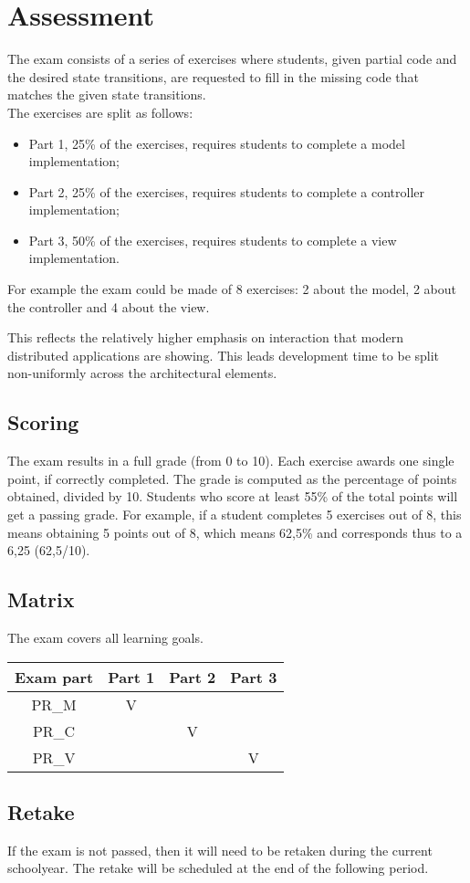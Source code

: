 \section{Assessment}

The exam consists of a series of exercises where students, given partial
code and the desired state transitions, are requested to fill in the
missing code that matches the given state transitions.
\\
The exercises are split as follows: 
\begin{itemize}
\item Part 1, 25\% of the exercises, requires students to complete a model implementation; 
\item Part 2, 25\% of the exercises, requires students to complete a controller implementation; 
\item Part 3, 50\% of the exercises, requires students to complete a view implementation.
\end{itemize}

For example the exam could be made of 8 exercises: 2 about the model, 2
about the controller and 4 about the view.

This reflects the relatively higher emphasis on interaction that modern
distributed applications are showing. This leads development time to be
split non-uniformly across the architectural elements.

\subsection*{Scoring}

The exam results in a full grade (from 0 to 10). Each exercise awards
one single point, if correctly completed. The grade is computed as the
percentage of points obtained, divided by 10. Students who score at
least 55\% of the total points will get a passing grade. For example, if
a student completes 5 exercises out of 8, this means obtaining 5 points
out of 8, which means 62,5\% and corresponds thus to a 6,25 (62,5/10).

\subsection*{Matrix}
The exam covers all learning goals.
\begin{center}
\begin{tabular}{ |c|c|c|c| } 
\hline 
Exam part & Part 1 &  Part 2  & Part 3 \\
\hline
PR\_M  & V &&\\
PR\_C  & &V& \\
PR\_V & & & V \\
\hline
\end{tabular}
\end{center}

\subsection{Retake}
 If the exam is not passed, then it will need to be retaken during the current schoolyear.
The retake will be scheduled at the end of the following period.



	
